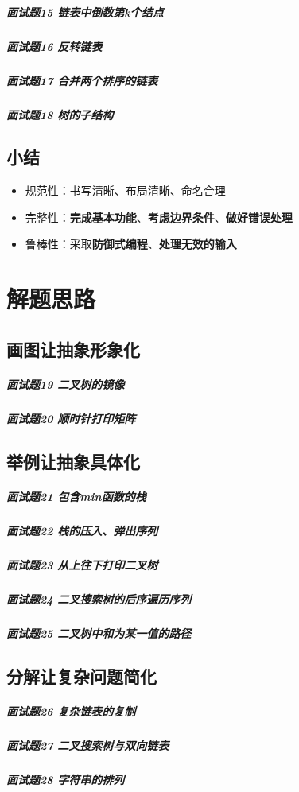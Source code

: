 \documentclass[UTF8,a4paper,12pt]{ctexbook}
\begin{document}
			\subparagraph{面试题15 链表中倒数第k个结点}
				
			\subparagraph{面试题16 反转链表}
				
			\subparagraph{面试题17 合并两个排序的链表}
			
			\subparagraph{面试题18 树的子结构}
		
		\subsection{小结}
			\begin{itemize}
				\item 规范性：书写清晰、布局清晰、命名合理 
				\item 完整性：\textbf{完成基本功能}、\textbf{考虑边界条件}、\textbf{做好错误处理} 
				\item 鲁棒性：采取\textbf{防御式编程}、\textbf{处理无效的输入}
			\end{itemize}		
		
	\section{解题思路}
		\subsection{画图让抽象形象化}
			\subparagraph{面试题19 二叉树的镜像}
			
			\subparagraph{面试题20 顺时针打印矩阵}
			
		\subsection{举例让抽象具体化}
			\subparagraph{面试题21 包含min函数的栈}
			
			\subparagraph{面试题22 栈的压入、弹出序列}
			
			\subparagraph{面试题23 从上往下打印二叉树}
			
			\subparagraph{面试题24 二叉搜索树的后序遍历序列}
			
			\subparagraph{面试题25 二叉树中和为某一值的路径}
			
		\subsection{分解让复杂问题简化}
			\subparagraph{面试题26 复杂链表的复制}
			
			\subparagraph{面试题27 二叉搜索树与双向链表}
			
			\subparagraph{面试题28 字符串的排列 }
\end{document}
